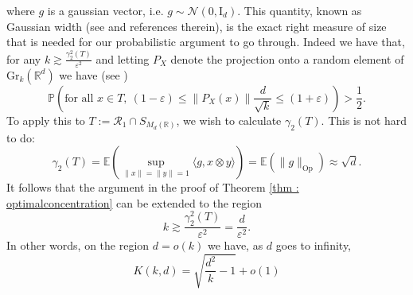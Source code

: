 \documentclass[11pt, a4paper, reqno]{elsarticle}
\theoremstyle{definition}
\theoremstyle{remark}
\begin{document}
        where $g$ is a gaussian vector, i.e. $g\sim \mathcal{N}(0,\mathrm{I}_d)$. This quantity, known
        as Gaussian width (see \cite[Chapter 9]{Vershynin2018} and references therein), is the exact right measure of size that
        is needed for our probabilistic argument to go through. Indeed we have that, for any 
        $k\gtrsim \frac{\gamma_2^2(T)}{\varepsilon^2}$ and letting $P_X$ denote the projection onto 
        a random element of $\mathrm{Gr}_k(\mathbb{R}^d)$ we have (see \cite[Section 4]{Klartag2005})
        \begin{equation*}
            \mathbb{P}\left(\text{for all } x\in T,\ (1-\varepsilon)
            \le \|P_X(x)\|\frac{d}{\sqrt k}\le (1+\varepsilon)\right)>\frac 12.
        \end{equation*}
        To apply this to $T:=\mathcal R_1\cap S_{M_d(\mathbb{R})}$, we wish to calculate $\gamma_2(T)$.
        This is not hard to do:
        \begin{equation*}
            \gamma_2(T)=\mathbb E\left(\sup_{\|x\|=\|y\|=1}\langle g, x\otimes y\rangle\right)
            =\mathbb E(\|g\|_{\mathrm{Op}})\approx \sqrt d.
        \end{equation*}
        It follows that the argument in the proof of Theorem \ref{thm : optimalconcentration}
        can be extended to the region
        \begin{equation*}
            k\gtrsim \frac{\gamma_2^2(T)}{\varepsilon^2}=\frac{d}{\varepsilon^2}.
        \end{equation*}
        In other words, on the region $d=o(k)$ we have, as $d$ goes to infinity,
        \begin{equation*}
            K(k,d)=\sqrt{\frac{d^2}{k}-1}+o(1)
        \end{equation*}
\end{document}
